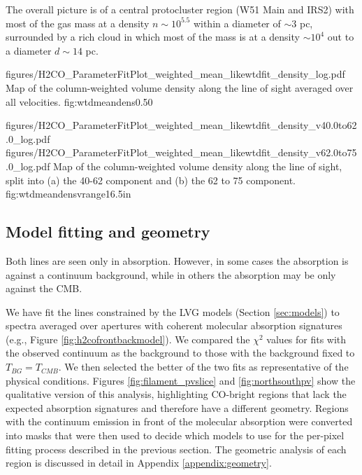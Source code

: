 The overall picture is of a central protocluster region (W51 Main and IRS2) with most
of the gas mass at a density $n\sim10^{5.5}$ \percc within a diameter of
$\sim3$ pc, surrounded by a rich cloud in which most of the mass is at a
density $\sim10^4$ \percc out to a diameter $d\sim14$ pc.


\Figure
{figures/H2CO_ParameterFitPlot_weighted_mean_likewtdfit_density_log.pdf}
{Map of the column-weighted volume density along the line of sight averaged
over all velocities.  }
{fig:wtdmeandens}{0.5}{0}

\FigureTwoAA
{figures/H2CO_ParameterFitPlot_weighted_mean_likewtdfit_density_v40.0to62.0_log.pdf}
{figures/H2CO_ParameterFitPlot_weighted_mean_likewtdfit_density_v62.0to75.0_log.pdf}
{Map of the column-weighted volume density along the line of sight, split into 
(a) the 40-62 \kms component and (b) the 62 to 75 \kms component.}
{fig:wtdmeandensvrange}{1}{6.5in}

\subsection{Model fitting and geometry}
\label{sec:geometry}
Both \formaldehyde lines are seen only in absorption.  However, in some cases
the absorption is against a continuum background, while in others the
absorption may be only against the CMB.

We have fit the \formaldehyde lines constrained by the LVG models (Section
\ref{sec:models}) to spectra averaged over apertures with coherent molecular
absorption signatures (e.g., Figure \ref{fig:h2cofrontbackmodel}).  We compared
the $\chi^2$ values for fits with the observed continuum as the background to
those with the background fixed to $T_{BG} = T_{CMB}$.  We then selected the
better of the two fits as representative of the physical conditions.  Figures
\ref{fig:filament_pvslice} and \ref{fig:northsouthpv} show the qualitative
version of this analysis, highlighting CO-bright regions that lack the expected
\formaldehyde absorption signatures and therefore have a different geometry.
Regions with the continuum emission in front of the molecular absorption were
converted into masks that were then used to decide which models to use for the
per-pixel fitting process described in the previous section.  The geometric
analysis of each region is discussed in detail in Appendix
\ref{appendix:geometry}.

